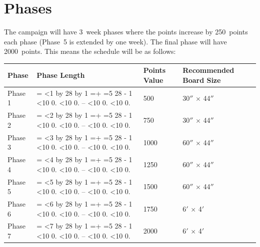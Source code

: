 \section{Phases}

The campaign will have 3~week phases where the points increase by 250~points each phase
(Phase~5 is extended by one week). The final phase will have 2000~points.
This means the schedule will be as follows:

\newcommand{\CampaignStartDate}{2026-09-14}
\newcommand{\DefaultPhaseLengthDays}{21}

\newcommand{\PhaseDurationDays}[1]{%
  \ifnum#1=5
    28%
  \else
    \DefaultPhaseLengthDays
  \fi
}

\newcount\julianCampaignStart
\newcount\phaseStartJulian
\newcount\phaseEndJulian
\newcount\phaseIter
\pgfcalendardatetojulian{\CampaignStartDate}{\julianCampaignStart}

\newcommand{\FormatJulianDate}[1]{%
  \pgfcalendarjuliantodate{#1}{\tmpYear}{\tmpMonth}{\tmpDay}%
  \ifnum\tmpDay<10 0\fi\number\tmpDay.%
  \ifnum\tmpMonth<10 0\fi\number\tmpMonth.%
  \tmpYear
}

\newcommand{\PhaseDateRange}[1]{%
  \phaseStartJulian=\julianCampaignStart
  \phaseIter=1
  \loop
  \ifnum\phaseIter<#1
    \advance\phaseStartJulian by \numexpr\PhaseDurationDays{\phaseIter}\relax
    \advance\phaseIter by 1
  \repeat
  \phaseEndJulian=\numexpr\phaseStartJulian + \PhaseDurationDays{#1} - 1\relax
  \FormatJulianDate{\phaseStartJulian}--\FormatJulianDate{\phaseEndJulian}%
}

\begin{center}
\renewcommand{\arraystretch}{1.25}
\begin{tabular}{@{}llll@{}}
\toprule
\textbf{Phase} & \textbf{Phase Length} & \textbf{Points Value} & \textbf{Recommended Board Size} \\
\midrule
Phase 1 & \PhaseDateRange{1} & 500  & 30$''$ $\times$ 44$''$ \\
Phase 2 & \PhaseDateRange{2} & 750  & 30$''$ $\times$ 44$''$ \\
Phase 3 & \PhaseDateRange{3} & 1000 & 60$''$ $\times$ 44$''$ \\
Phase 4 & \PhaseDateRange{4} & 1250 & 60$''$ $\times$ 44$''$ \\
Phase 5 & \PhaseDateRange{5} & 1500 & 60$''$ $\times$ 44$''$ \\
Phase 6 & \PhaseDateRange{6} & 1750 & 6$'$ $\times$ 4$'$ \\
Phase 7 & \PhaseDateRange{7} & 2000 & 6$'$ $\times$ 4$'$ \\
\bottomrule
\end{tabular}
\end{center}
